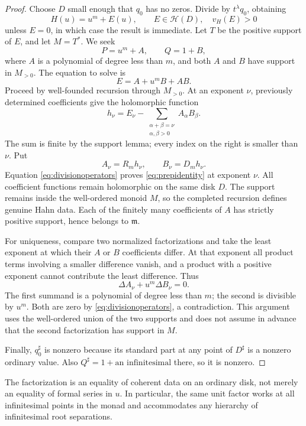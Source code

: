 \documentclass[11pt,letterpaper]{article}
\theoremstyle{definition}
\theoremstyle{remark}
\newcommand{\HH}{\mathcal H}
\newcommand{\mm}{\mathfrak m}
\newcommand{\sh}{^{\sharp}}
\numberwithin{equation}{section}
\begin{document}
\begin{proof}
Choose $D$ small enough that $q_0$ has no zeros. Divide by $t^\lambda q_0$, obtaining
\[
 H(u)=u^m+E(u),\qquad E\in\HH(D),\quad v_H(E)>0
\]
unless $E=0$, in which case the result is immediate. Let $T$ be the positive support of $E$, and let $M=T^*$. We seek
\[
 P=u^m+A,\qquad Q=1+B,
\]
where $A$ is a polynomial of degree less than $m$, and both $A$ and $B$ have support in $M_{>0}$. The equation to solve is
\begin{equation}\label{eq:prepidentity}
 E=A+u^mB+AB.
\end{equation}
Proceed by well-founded recursion through $M_{>0}$. At an exponent $\nu$, previously determined coefficients give the holomorphic function
\[
 h_\nu=E_\nu-\sum_{\substack{\alpha+\beta=\nu\\\alpha,\beta>0}}A_\alpha B_\beta.
\]
The sum is finite by the support lemma; every index on the right is smaller than $\nu$. Put
\begin{equation}\label{eq:preprecursion}
 A_\nu=R_mh_\nu,\qquad B_\nu=D_mh_\nu.
\end{equation}
Equation \eqref{eq:divisionoperators} proves \eqref{eq:prepidentity} at exponent $\nu$. All coefficient functions remain holomorphic on the same disk $D$. The support remains inside the well-ordered monoid $M$, so the completed recursion defines genuine Hahn data. Each of the finitely many coefficients of $A$ has strictly positive support, hence belongs to $\mm$.

For uniqueness, compare two normalized factorizations and take the least exponent at which their $A$ or $B$ coefficients differ. At that exponent all product terms involving a smaller difference vanish, and a product with a positive exponent cannot contribute the least difference. Thus
\[
 \Delta A_\nu+u^m\Delta B_\nu=0.
\]
The first summand is a polynomial of degree less than $m$; the second is divisible by $u^m$. Both are zero by \eqref{eq:divisionoperators}, a contradiction. This argument uses the well-ordered union of the two supports and does not assume in advance that the second factorization has support in $M$.

Finally, $q_0\sh$ is nonzero because its standard part at any point of $D\sh$ is a nonzero ordinary value. Also $Q\sh=1+\text{an infinitesimal}$ there, so it is nonzero.
\end{proof}
The factorization is an equality of coherent data on an ordinary disk, not merely an equality of formal series in $u$. In particular, the same unit factor works at all infinitesimal points in the monad and accommodates any hierarchy of infinitesimal root separations.
\end{document}
